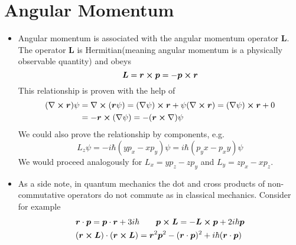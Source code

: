 \documentclass[11pt, a4paper]{article}
\renewcommand{\curl}{\nabla \cross}
\renewcommand{\grad}{\nabla}
\newcommand{\Herm}{Hermitian\xspace}
\renewcommand{\vec}[1]{\bm{#1}}  %
\renewcommand{\r}{\vec{r}}  %
\renewcommand{\L}{\vec{L}}  %
\newcommand{\p}{\psi}  %
\begin{document}
\newpage
\section{Angular Momentum}
\begin{itemize}
	\item Angular momentum is associated with the angular momentum operator $ \vec{L} $. The operator $ \vec{L} $ is \Herm (meaning angular momentum is a physically observable quantity) and obeys
	\begin{equation*}
		\L = \r \cross \vec{p} = - \vec{p} \cross \r
	\end{equation*}
	This relationship is proven with the help of
	\begin{align*}
		(\curl \r)\p &= \curl (\r \p) = (\grad \p) \cross \r + \p (\curl \r) = (\grad \p)\cross \r + 0\\
		& = - \r \cross (\grad \p) = - (\r \cross \grad)\p
	\end{align*}
	We could also prove the relationship by components, e.g.
	\begin{equation*}
		L_{z}\p = - i\hbar(y p_{x} - xp_{y}) \p = i\hbar(p_{y}x - p_{x}y)\p
	\end{equation*}
	We would proceed analogously for $ L_{x} = yp_{z} - zp_{y} $ and $ L_{y} = zp_{x} - x p_{z} $. 
	
	\item As a side note, in quantum mechanics the dot and cross products of non-commutative operators do not commute as in classical mechanics. Consider for example
	\begin{align*}
		&\r \cdot \vec{p} = \vec{p} \cdot \r + 3i\hbar \qquad \vec{p} \cross \L = - \L \cross \vec{p} + 2i\hbar \vec{p} \\
		& (\r \cross \L)\cdot (\r \cross \L) = \r^{2}\vec{p}^{2} - (\r \cdot \vec{p})^{2} + i \hbar (\r \cdot \vec{p})
	\end{align*}
	

\end{itemize}
\end{document}
